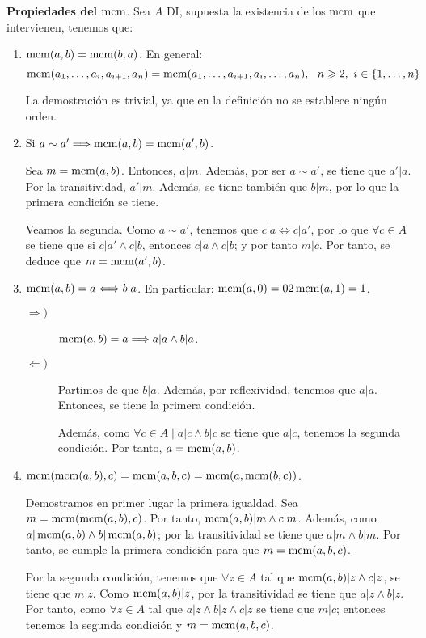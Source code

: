 \textbf{Propiedades del $\operatorname{mcm}$}. Sea $A$ DI, supuesta la existencia de los $\operatorname{mcm}$ que intervienen, tenemos que:
\begin{enumerate}
    \item $\operatorname{mcm}(a,b)=\operatorname{mcm}(b,a)$. En general:
    $$\operatorname{mcm}(a_1, \ldots, a_i, a_{i+1}, a_n) = \operatorname{mcm}(a_1, \ldots, a_{i+1}, a_i, \ldots, a_n),~~n\geqslant2,~i\in \{1, \ldots, n\}$$

    La demostración es trivial, ya que en la definición no se establece ningún orden.

    \item Si $a\sim a' \Longrightarrow \operatorname{mcm}(a,b) = \operatorname{mcm}(a',b)$.
    
    Sea $m = \operatorname{mcm}(a,b)$. Entonces, $a|m$. Además, por ser $a\sim a'$, se tiene que $a'|a$. Por la transitividad, $a'|m$. Además, se tiene también que $b|m$, por lo que la primera condición se tiene.

    Veamos la segunda. Como $a\sim a'$, tenemos que $c|a\Longleftrightarrow c|a'$, por lo que $\forall c\in A$ se tiene que si $c|a'\land c|b$, entonces $c|a\land c|b$; y por tanto $m|c$. Por tanto, se deduce que 
    $m=\operatorname{mcm}(a',b)$.

    \item $\operatorname{mcm}(a,b)=a \Longleftrightarrow b|a$. En particular: $\operatorname{mcm}(a,0) = 0 2 \operatorname{mcm}(a,1) = 1$.
    \begin{description}
        \item[$\Longrightarrow)$] $\operatorname{mcm}(a,b)=a\Longrightarrow a|a\land b|a$.
        \item[$\Longleftarrow)$] Partimos de que $b|a$. Además, por reflexividad, tenemos que $a|a$. Entonces, se tiene la primera condición.

        Además, como $\forall c\in A\mid a|c\land b|c$ se tiene que $a|c$, tenemos la segunda condición. Por tanto, $a=\operatorname{mcm}(a,b)$.
    \end{description}


    \item $\operatorname{mcm}(\operatorname{mcm}(a,b), c)=\operatorname{mcm}(a,b,c) = \operatorname{mcm}(a,\operatorname{mcm}(b,c))$.

    Demostramos en primer lugar la primera igualdad. Sea $m=\operatorname{mcm}(\operatorname{mcm}(a,b),c)$. Por tanto, $\operatorname{mcm}(a,b)|m\land c|m$. Además, como $a|\operatorname{mcm}(a,b)\land b|\operatorname{mcm}(a,b)$; por la transitividad se tiene que $a|m\land b|m$. Por tanto, se cumple la primera condición para que $m=\operatorname{mcm}(a,b,c)$.

    Por la segunda condición, tenemos que $\forall z\in A$ tal que $\operatorname{mcm}(a,b)|z \land c|z$, se tiene que $m|z$. Como $\operatorname{mcm}(a,b)|z$, por la transitividad se tiene que $a|z\land b|z$. Por tanto, como $\forall z\in A$ tal que $a|z\land b|z\land c|z$ se tiene que $m|c$; entonces tenemos la segunda condición y $m=\operatorname{mcm}(a,b,c)$.\\


\end{enumerate}

